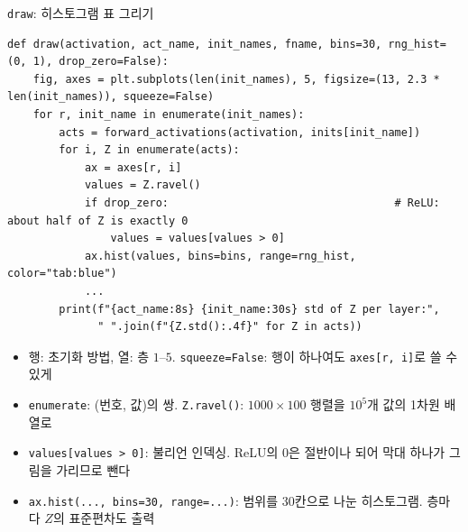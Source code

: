 \documentclass[aspectratio=169,11pt]{beamer}
\newcommand{\codesmall}{\ttfamily\fontsize{7.4}{8.3}\selectfont}
\newcommand{\code}[1]{\texttt{#1}}
\begin{document}
\begin{frame}{\code{draw}: 히스토그램 표 그리기}
\small
\begin{lstlisting}[basicstyle=\codesmall]
def draw(activation, act_name, init_names, fname, bins=30, rng_hist=(0, 1), drop_zero=False):
    fig, axes = plt.subplots(len(init_names), 5, figsize=(13, 2.3 * len(init_names)), squeeze=False)
    for r, init_name in enumerate(init_names):
        acts = forward_activations(activation, inits[init_name])
        for i, Z in enumerate(acts):
            ax = axes[r, i]
            values = Z.ravel()
            if drop_zero:                                   # ReLU: about half of Z is exactly 0
                values = values[values > 0]
            ax.hist(values, bins=bins, range=rng_hist, color="tab:blue")
            ...
        print(f"{act_name:8s} {init_name:30s} std of Z per layer:",
              " ".join(f"{Z.std():.4f}" for Z in acts))
\end{lstlisting}
\small
\begin{itemize}
\item 행: 초기화 방법, 열: 층 $1$--$5$. \code{squeeze=False}: 행이 하나여도 \code{axes[r, i]}로 쓸 수 있게
\item \code{enumerate}: (번호, 값)의 쌍. \code{Z.ravel()}: $1000\times100$ 행렬을 $10^5$개 값의 1차원 배열로
\item \code{values[values > 0]}: 불리언 인덱싱. ReLU의 $0$은 절반이나 되어 막대 하나가 그림을 가리므로 뺀다
\item \code{ax.hist(..., bins=30, range=...)}: 범위를 30칸으로 나눈 히스토그램. 층마다 $Z$의 표준편차도 출력
\end{itemize}
\end{frame}
\end{document}
